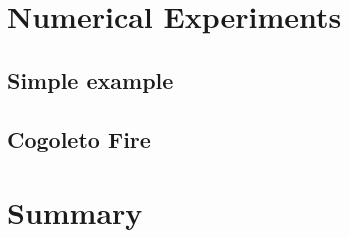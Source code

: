 \documentclass[journal,article,atmosphere,submit,moreauthors,pdftex]{Definitions/mdpi}
\begin{document}
\section{Numerical Experiments} \label{sec:numexp}





\subsection{Simple example}  \label{sec:simexp}




\subsection{Cogoleto Fire}  \label{sec:cogo}




\section{Summary} \label{sec:summary}

















\end{document}
